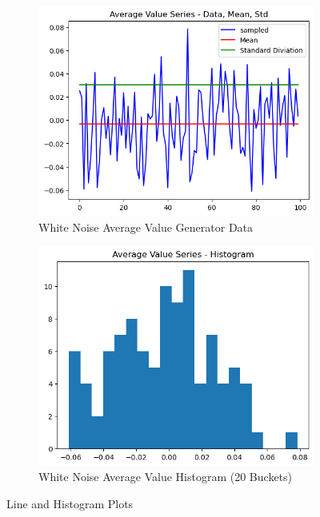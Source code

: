 \documentclass{article}
\begin{document}
 \begin{figure}[htbp]
  \centering
  \begin{subfigure}[b]{0.45\textwidth}
    \includegraphics[width=\textwidth]{img/wn_average_value/data.png}
    \caption{White Noise Average Value Generator Data}
    \label{fig:Avgvaluelines}
  \end{subfigure}
  \hfill
  \begin{subfigure}[b]{0.45\textwidth}
    \includegraphics[width=\textwidth]{img/wn_average_value/histogram.png}
    \caption{White Noise Average Value Histogram (20 Buckets)}
    \label{fig:Avgvaluehist}
  \end{subfigure}
  \caption{Line and Histogram Plots}
  \label{fig:avgvalue1}
\end{figure}
\end{document}
